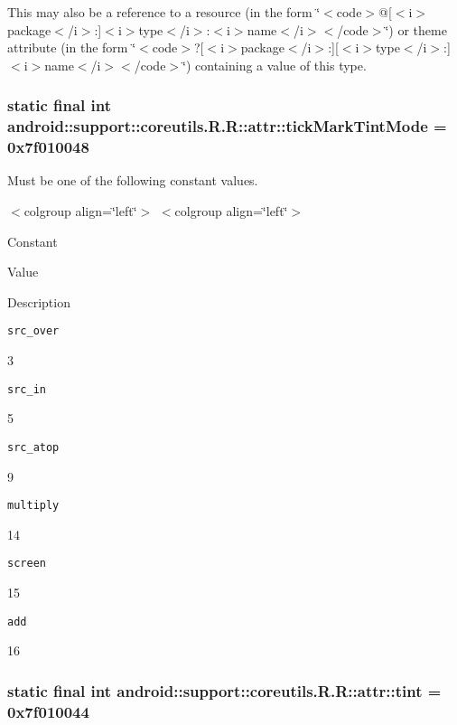 This may also be a reference to a resource (in the form \char`\"{}$<$code$>$@\mbox{[}$<$i$>$package$<$/i$>$:\mbox{]}$<$i$>$type$<$/i$>$:$<$i$>$name$<$/i$>$$<$/code$>$\char`\"{}) or theme attribute (in the form \char`\"{}$<$code$>$?\mbox{[}$<$i$>$package$<$/i$>$:\mbox{]}\mbox{[}$<$i$>$type$<$/i$>$:\mbox{]}$<$i$>$name$<$/i$>$$<$/code$>$\char`\"{}) containing a value of this type. \hypertarget{classandroid_1_1support_1_1coreutils_1_1_r_1_1attr_7cc8578a3a74d24df452a38556eec28d}{
\subsubsection[{tickMarkTintMode}]{\setlength{\rightskip}{0pt plus 5cm}static final int android::support::coreutils.R.R::attr::tickMarkTintMode = 0x7f010048}}
\label{classandroid_1_1support_1_1coreutils_1_1_r_1_1attr_7cc8578a3a74d24df452a38556eec28d}


Must be one of the following constant values. \begin{TabularC}{0}
\hline
\end{TabularC}
$<$colgroup align=\char`\"{}left\char`\"{}$>$ $<$colgroup align=\char`\"{}left\char`\"{}$>$ 

Constant

Value

Description 

{\tt src\_\-over}

3

{\tt src\_\-in}

5

{\tt src\_\-atop}

9

{\tt multiply}

14

{\tt screen}

15

{\tt add}

16\hypertarget{classandroid_1_1support_1_1coreutils_1_1_r_1_1attr_8456f239685f622db96ca7d7a15fffd4}{
\subsubsection[{tint}]{\setlength{\rightskip}{0pt plus 5cm}static final int android::support::coreutils.R.R::attr::tint = 0x7f010044}}
\label{classandroid_1_1support_1_1coreutils_1_1_r_1_1attr_8456f239685f622db96ca7d7a15fffd4}


